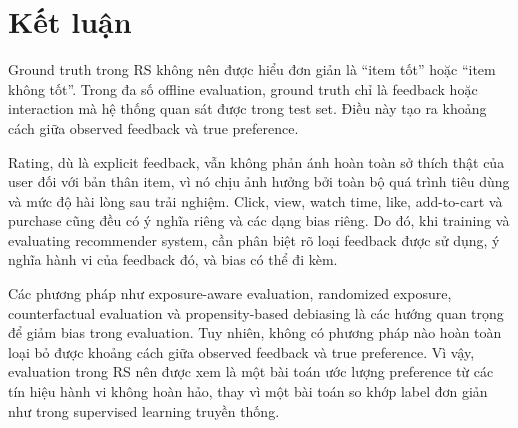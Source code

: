 \documentclass[12pt,a4paper]{article}
\begin{document}
\section{Kết luận}

Ground truth trong RS không nên được hiểu đơn giản là ``item tốt'' hoặc ``item không tốt''. 
Trong đa số offline evaluation, ground truth chỉ là feedback hoặc interaction mà hệ thống quan sát được trong test set. 
Điều này tạo ra khoảng cách giữa observed feedback và true preference.

Rating, dù là explicit feedback, vẫn không phản ánh hoàn toàn sở thích thật của user đối với bản thân item, vì nó chịu ảnh hưởng bởi toàn bộ quá trình tiêu dùng và mức độ hài lòng sau trải nghiệm. 
Click, view, watch time, like, add-to-cart và purchase cũng đều có ý nghĩa riêng và các dạng bias riêng. 
Do đó, khi training và evaluating recommender system, cần phân biệt rõ loại feedback được sử dụng, ý nghĩa hành vi của feedback đó, và bias có thể đi kèm.

Các phương pháp như exposure-aware evaluation, randomized exposure, counterfactual evaluation và propensity-based debiasing là các hướng quan trọng để giảm bias trong evaluation. 
Tuy nhiên, không có phương pháp nào hoàn toàn loại bỏ được khoảng cách giữa observed feedback và true preference. 
Vì vậy, evaluation trong RS nên được xem là một bài toán ước lượng preference từ các tín hiệu hành vi không hoàn hảo, thay vì một bài toán so khớp label đơn giản như trong supervised learning truyền thống.
\end{document}

